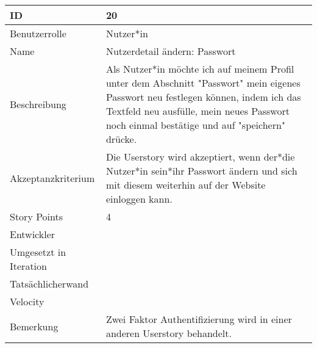 \begin{tabularx}{\textwidth}{|p{}|X|}
	\hline
	ID & 20\\
	\hline
	Benutzerrolle & Nutzer*in\\
	\hline
	Name & Nutzerdetail ändern: Passwort\\
	\hline
	Beschreibung & Als Nutzer*in möchte ich auf meinem Profil unter dem Abschnitt "Passwort" mein eigenes Passwort neu festlegen können, indem ich das Textfeld neu ausfülle, mein neues Passwort noch einmal bestätige und auf "speichern" drücke.\\
	\hline
	Akzeptanzkriterium & Die Userstory wird akzeptiert, wenn der*die Nutzer*in sein*ihr Passwort ändern und sich mit diesem weiterhin auf der Website einloggen kann.\\
	\hline
	Story Points & 4\\
	\hline
	Entwickler & \\
	\hline
	Umgesetzt in Iteration & \\ 
	\hline
	Tatsächlicherwand & \\
	\hline
	Velocity & \\
	\hline
	Bemerkung & Zwei Faktor Authentifizierung wird in einer anderen Userstory behandelt.\\
	\hline
\end{tabularx}
\vspace{20pt}
